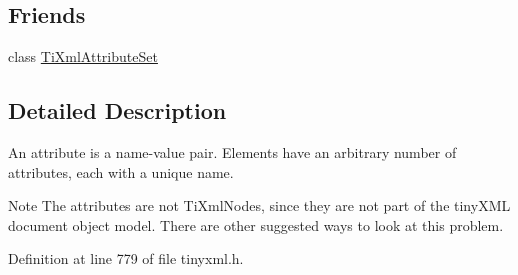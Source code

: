 \subsection*{Friends}
\begin{DoxyCompactItemize}
\item 
class \hyperlink{classTiXmlAttribute_a35a7b7f89f708527677d5078d41ce0bf}{TiXmlAttributeSet}
\end{DoxyCompactItemize}


\subsection{Detailed Description}
An attribute is a name-\/value pair. Elements have an arbitrary number of attributes, each with a unique name.

\begin{DoxyNote}{Note}
The attributes are not TiXmlNodes, since they are not part of the tinyXML document object model. There are other suggested ways to look at this problem. 
\end{DoxyNote}


Definition at line 779 of file tinyxml.h.




